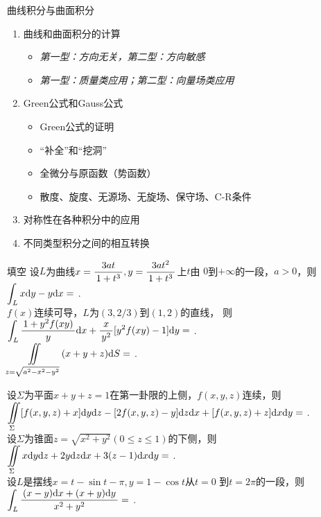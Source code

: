 \renewcommand{\b}{\color{blue!80!black}}

\begin{frame}{曲线积分与曲面积分}
	\linespread{1.2}
	\begin{enumerate}
	  \item 曲线和曲面积分的计算
	  \begin{itemize}
	    \item {\it 第一型：方向无关，第二型：方向敏感}
	    \item {\it 第一型：质量类应用；第二型：向量场类应用}
	  \end{itemize}
	  \item Green公式和Gauss公式
	  {\it
	  \begin{itemize}
	    \item Green公式的证明
	    \item “补全”和“挖洞”
	    \item 全微分与原函数（势函数）
	    \item 散度、旋度、无源场、无旋场、保守场、C-R条件
	  \end{itemize}
	  }
	  \item 对称性在各种积分中的应用
	  \item 不同类型积分之间的相互转换
	\end{enumerate}
\end{frame}

\begin{frame}{填空}
	\linespread{1.5}
	设$L$为曲线$x=\displaystyle\frac{\,{3at}\,}{\,{1+t^3}\,},y=\displaystyle\frac{\,{3at^2}\,}{\,{1+t^3}\,}$上$t$由
	$0$到$+\infty$的一段，$a>0$，则$\displaystyle\int_Lx\mathrm{d} y-y\mathrm{d} x=$
	\underline{\uncover<2->{\;\b{$3a^2$}}\;}.\\[1em]
	
	$f(x)$连续可导，$L$为$(3,2/3)$到$(1,2)$的直线，
	则$\displaystyle\int_L\displaystyle\frac{\,{1+y^2f(xy)}\,}{\,{y}\,}\mathrm{d} x+\displaystyle\frac{\,{x}\,}{\,{y^2}\,}[y^2f(xy)-1]\mathrm{d} y=$
	\underline{\uncover<3->{\;\b{$-4$}}\;}.\\[1em]
	
	$\displaystyle\iint\limits_{z=\sqrt{a^2-x^2-y^2}}(x+y+z)\mathrm{d} S=$
	\underline{\uncover<4->{\;\b{$\pi a^3$}}\;}.\\[1em]
\end{frame}

\begin{frame}
	\linespread{1.5}
	设$\Sigma$为平面$x+y+z=1$在第一卦限的上侧，$f(x,y,z)$连续，则
	$\displaystyle\iint\limits_{\Sigma}[f(x,y,z)+x]\mathrm{d} y\mathrm{d} z-[2f(x,y,z)-y]\mathrm{d} z\mathrm{d} x+
	[f(x,y,z)+z]\mathrm{d} x\mathrm{d} y=$
	\underline{\uncover<2->{\;\b{$\df12$}}\;}.\\[1em]
	
	设$\Sigma$为锥面$z=\sqrt{x^2+y^2}(0\leq z\leq 1)$的下侧，则
	$\displaystyle\iint\limits_{\Sigma}x\mathrm{d} y\mathrm{d} z+2y\mathrm{d} z\mathrm{d} x+3(z-1)\mathrm{d} x\mathrm{d} y=$
	\underline{\uncover<3->{\;\b{$2\pi$}}\;}.\\[1em]
	
	设$L$是摆线$x=t-\sin t-\pi,y=1-\cos t$从$t=0$
	到$t=2\pi$的一段，则$\displaystyle\int_L\displaystyle\frac{\,{(x-y)\mathrm{d} x+(x+y)\mathrm{d} y}\,}{\,{x^2+y^2}\,}=$
	\underline{\uncover<4->{\;\b{$\pi$}}\;}.\\[1em]
\end{frame}

